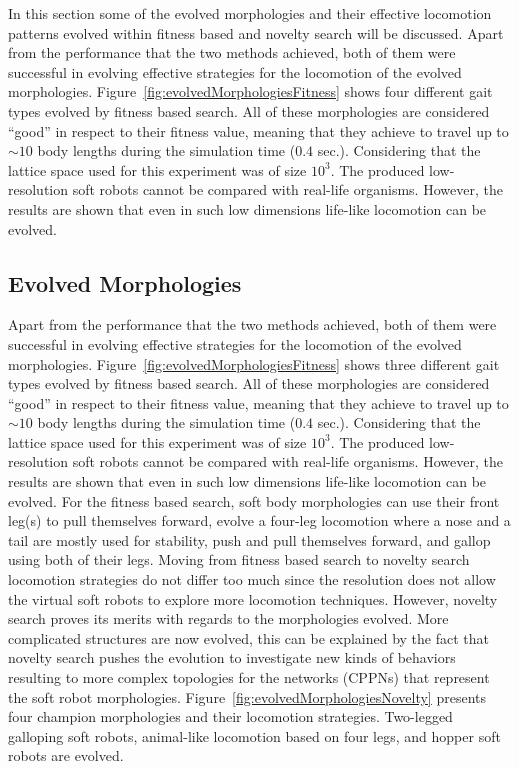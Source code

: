\documentclass{sig-alternate}
\begin{document}
In this section some of the evolved morphologies and their effective locomotion patterns evolved within fitness based and novelty search will be discussed. Apart from the performance that the two methods achieved, both of them were successful in evolving effective strategies for the locomotion of the evolved morphologies. Figure~\ref{fig:evolvedMorphologiesFitness} shows four different gait types evolved by fitness based search. All of these morphologies are considered ``good'' in respect to their fitness value, meaning that they achieve to travel up to $\sim 10$ body lengths during the simulation time ($0.4$ sec.). Considering that the lattice space used for this experiment was of size $10^3$. The produced low-resolution soft robots cannot be compared with real-life organisms. However, the results are shown that even in such low dimensions life-like locomotion can be evolved.

\subsection{Evolved Morphologies} 
Apart from the performance that the two methods achieved, both of them were successful in evolving effective strategies for the locomotion of the evolved morphologies. Figure~\ref{fig:evolvedMorphologiesFitness} shows three different gait types evolved by fitness based search. All of these morphologies are considered ``good'' in respect to their fitness value, meaning that they achieve to travel up to $\sim 10$ body lengths during the simulation time ($0.4$ sec.). Considering that the lattice space used for this experiment was of size $10^3$. The produced low-resolution soft robots cannot be compared with real-life organisms. However, the results are shown that even in such low dimensions life-like locomotion can be evolved. For the fitness based search, soft body morphologies can use their front leg(s) to pull themselves forward, evolve a four-leg locomotion where a nose and a tail are mostly used for stability, push and pull themselves forward, and gallop using both of their legs. Moving from fitness based search to novelty search locomotion strategies do not differ too much since the resolution does not allow the virtual soft robots to explore more locomotion techniques. However, novelty search proves its merits with regards to the morphologies evolved. More complicated structures are now evolved, this can be explained by the fact that novelty search pushes the evolution to investigate new kinds of behaviors resulting to more complex topologies for the networks (CPPNs) that represent the soft robot morphologies. Figure~\ref{fig:evolvedMorphologiesNovelty} presents four champion morphologies and their locomotion strategies. Two-legged galloping soft robots, animal-like locomotion based on four legs, and hopper soft robots are evolved.
\end{document}
